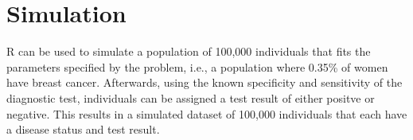 \documentclass{report}\usepackage[]{graphicx}\usepackage[]{color}
\begin{document}
\section{Simulation}


\textsf{R} can be used to simulate a population of 100,000 individuals that fits the parameters specified by the problem, i.e., a population where 0.35\% of women have breast cancer. Afterwards, using the known specificity and sensitivity of the diagnostic test, individuals can be assigned a test result of either positve or negative. This results in a simulated dataset of 100,000 individuals that each have a disease status and test result. 
\end{document}
